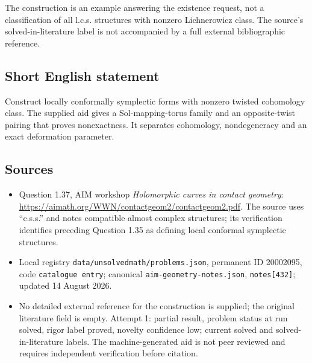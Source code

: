 \documentclass[11pt]{article}
\begin{document}
The construction is an example answering the existence request, not a classification of all l.c.s. structures with nonzero Lichnerowicz class. The source's solved-in-literature label is not accompanied by a full external bibliographic reference.
\subsection{Short English statement}
Construct locally conformally symplectic forms with nonzero twisted cohomology class. The supplied aid gives a Sol-mapping-torus family and an opposite-twist pairing that proves nonexactness. It separates cohomology, nondegeneracy and an exact deformation parameter.
\subsection{Sources}
\begin{itemize}
\item Question 1.37, AIM workshop \emph{Holomorphic curves in contact geometry}: \url{https://aimath.org/WWN/contactgeom2/contactgeom2.pdf}. The source uses ``c.s.s.'' and notes compatible almost complex structures; its verification identifies preceding Question 1.35 as defining local conformal symplectic structures.
\item Local registry \texttt{data/unsolvedmath/problems.json}, permanent ID 20002095, code \texttt{catalogue entry}; canonical \texttt{aim-geometry-notes.json}, \texttt{notes[432]}; updated 14 August 2026.
\item No detailed external reference for the construction is supplied; the original literature field is empty. Attempt 1: partial result, problem status at run solved, rigor label proved, novelty confidence low; current solved and solved-in-literature labels. The machine-generated aid is not peer reviewed and requires independent verification before citation.
\end{itemize}
\end{document}
